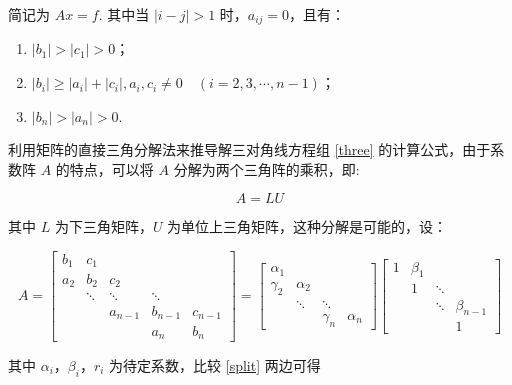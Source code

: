 简记为 \textbf{$Ax=f$}. 其中当 $\left|i-j\right| > 1$ 时，$a_{ij} = 0$，且有：

\begin{enumerate}
    \item $\left|b_1\right| > \left|c_1\right| > 0$；
    \item $\left|b_i\right| \geq \left|a_i\right| + \left|c_i\right|, a_i, c_i \neq 0\quad(i=2,3,\cdots,n-1)$；
    \item $\left|b_n\right| > \left|a_n\right| > 0$.
\end{enumerate}

利用矩阵的直接三角分解法来推导解三对角线方程组 \eqref{three} 的计算公式，由于系数阵 $A$ 的特点，可以将 $A$ 分解为两个三角阵的乘积，即:

\[A=LU\]

其中 $L$ 为下三角矩阵，$U$ 为单位上三角矩阵，这种分解是可能的，设：

\begin{equation}
    A =
    \begin{bmatrix}
        b_1 & c_1                                  \\
        a_2 & b_2    & c_2                         \\
            & \ddots & \ddots  & \ddots            \\
            &        & a_{n-1} & b_{n-1} & c_{n-1} \\
            &        &         & a_n     & b_n
    \end{bmatrix}
    =
    \begin{bmatrix}
        \alpha_1                                  \\
        \gamma_2 & \alpha_2                       \\
                 & \ddots   & \ddots              \\
                 &          & \gamma_n & \alpha_n
    \end{bmatrix}
    \begin{bmatrix}
        1 & \beta_1                        \\
          & 1       & \ddots               \\
          &         & \ddots & \beta_{n-1} \\
          &         &        & 1
    \end{bmatrix}
    \label{split}
\end{equation}

其中 $\alpha_i$，$\beta_i$，$r_i$ 为待定系数，比较 \eqref{split} 两边可得

